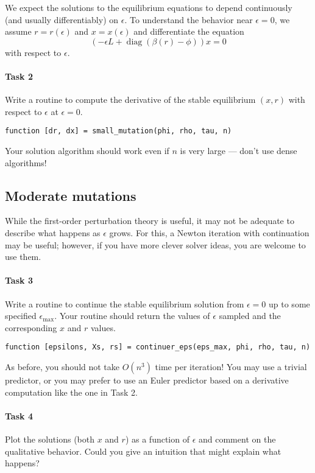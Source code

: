 \documentclass[12pt, leqno]{article} %
\begin{document}
We expect the solutions to the equilibrium equations to depend
continuously (and usually differentiably) on $\epsilon$.
To understand the behavior near $\epsilon = 0$, we assume
$r = r(\epsilon)$ and $x = x(\epsilon)$ and differentiate
the equation
\[
  \left( -\epsilon L + \operatorname{diag}(\beta(r)-\phi) \right) x = 0
\]
with respect to $\epsilon$.

\paragraph{Task 2}
Write a routine to compute the derivative of the stable
equilibrium $(x,r)$ with respect to $\epsilon$ at $\epsilon = 0$.
\begin{lstlisting}[frame=single]
function [dr, dx] = small_mutation(phi, rho, tau, n)
\end{lstlisting}
Your solution algorithm should work even if $n$ is very large ---
don't use dense algorithms!

\subsection{Moderate mutations}

While the first-order perturbation theory is useful, it may not
be adequate to describe what happens as $\epsilon$ grows.  For this,
a Newton iteration with continuation may be useful; however, if you
have more clever solver ideas, you are welcome to use them.

\paragraph{Task 3}
Write a routine to continue the stable equilibrium solution
from $\epsilon = 0$ up to some specified $\epsilon_{\max}$.
Your routine should return the values of $\epsilon$ sampled
and the corresponding $x$ and $r$ values.
\begin{lstlisting}[frame=single]
function [epsilons, Xs, rs] = continuer_eps(eps_max, phi, rho, tau, n)
\end{lstlisting}
As before, you should not take $O(n^3)$ time per iteration!  You may
use a trivial predictor, or you may prefer to use an Euler predictor
based on a derivative computation like the one in Task 2.

\paragraph{Task 4}
Plot the solutions (both $x$ and $r$) as a function of $\epsilon$ and
comment on the qualitative behavior.  Could you give an intuition that
might explain what happens?
\end{document}

